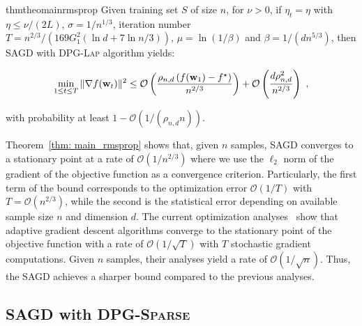 \documentclass[11pt]{article}
\begin{document}
\begin{restatable}{thm}{theomainrmsprop}
\label{thm: main_rmsprop}
 Given training set $S$ of size $n$, for $\nu >0$, if $\eta_t = \eta$  with $\eta \leq \nu/(2L)$,  $\sigma = 1/n^{1/3}$, iteration number $T = n^{2/3}/\left(169G_1^2(\ln d +7\ln n/3)\right)$, $\mu = \ln (1/\beta)$ and $\beta = 1/(d n^{5/3})$, then \textsc{SAGD} with \textsc{DPG-Lap} algorithm yields:
 \begin{small}
\begin{equation*}
 \min_{1\leq t \leq T}\|\nabla f(\mathbf{w}_t)\|^2 \leq
\mathcal{O} \left( \frac{\rho_{n,d} \left(f(\mathbf{w}_1) - f^\star \right)}{n^{2/3}} \right) + \mathcal{O} \left( \frac{d \rho_{n,d}^2}{n^{2/3}}\right)~,
\end{equation*}
\end{small}
with probability at least $1-\mathcal{O} \left(1/(\rho_{n,d} n)\right)$.
\end{restatable} 
Theorem~\ref{thm: main_rmsprop} shows that, given $n$ samples, \textsc{SAGD} converges to a stationary point at a rate of $\mathcal{O}(1/n^{2/3})$ where we use the $\ell_2$ norm of the gradient of the objective function as a convergence criterion.
Particularly, the first term of the bound corresponds to the optimization error $\mathcal{O}(1/T)$ with $T = \mathcal{O}(n^{2/3})$, while the second is the statistical error depending on available sample size $n$ and dimension $d$. 
The current optimization analyses~\citep{zare18, wawu19, zosh2019, cheli2019} show that adaptive gradient descent algorithms converge to the stationary point of the objective function with a rate of $\mathcal{O}(1/\sqrt{T})$ with $T$ stochastic gradient computations. 
Given $n$ samples, their analyses yield a rate of  $\mathcal{O}(1/\sqrt{n})$. 
Thus, the \textsc{SAGD} achieves a sharper bound compared to the previous analyses.  

\subsection{\textsc{SAGD} with \textsc{DPG-Sparse}} \label{subsec: SAGD-sparse}
\end{document}

